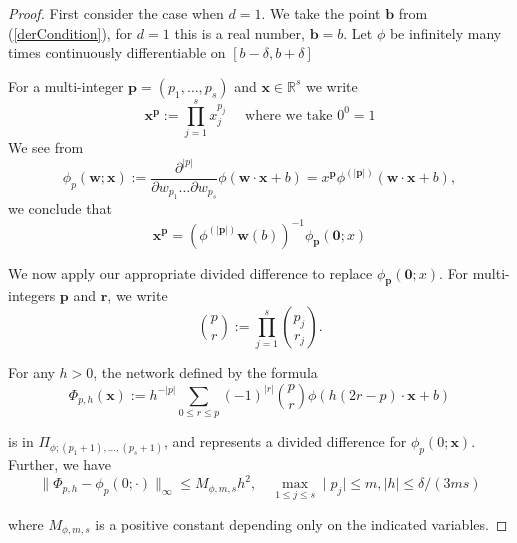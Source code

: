 \documentclass[11pt,a4paper]{article}
\theoremstyle{plain}
\theoremstyle{definition}
\theoremstyle{remark}
\numberwithin{equation}{section}
\begin{document}
\begin{proof}
    
First consider the case when \(d = 1\). We take the point \(\mathbf{b} \) from (\ref{derCondition}), for \(d = 1\) this is a real number, \(\mathbf{b} = b \).
Let \(\phi \) be infinitely many times continuously differentiable on \([b-\delta ,b+\delta ]\)

For a multi-integer \(\mathbf{p} = (p_1, \ldots , p_{s} )\) and \(\mathbf{x} \in \mathbb{R}^s\) we write 
\begin{equation}
    \mathbf{x}^{\mathbf{p} } := \prod_{j=1}^{s} x_{j}^{p_{j}} \quad \text{ where we take } 0^0 = 1
\end{equation}
We see from
\begin{equation}
    \phi_{p}(\mathbf{w}; \mathbf{x}) := \frac{\partial^{|p|}}{\partial w_{p_1} \dots \partial w_{p_s}} \phi(\mathbf{w} \cdot \mathbf{x} + b) = x^{\mathbf{p} } \phi^{(|\mathbf{p}|)}(\mathbf{w} \cdot \mathbf{x} + b),
\end{equation}
we conclude that
\begin{equation}
    \mathbf{x}^{\mathbf{p} } = \left(
        \phi^{(|\mathbf{p}|)}\mathbf{w} (b)
        \right)^{-1} \phi_{\mathbf{p} }(\textbf{0} ; x)
\end{equation}

We now apply our appropriate divided difference to replace \(\phi_{\mathbf{p} }(\textbf{0} ; x)\).
For multi-integers \(\mathbf{p}\) and \(\mathbf{r} \), we write
\begin{equation}
    \binom{p}{r} := \prod_{j=1}^{s} \binom{p_j}{r_j}.
\end{equation}

For any \( h > 0 \), the network defined by the formula
\begin{equation}
    \Phi_{p,h}(\mathbf{x}) := h^{-|p|} \sum_{0 \leq r \leq p} (-1)^{|r|} \binom{p}{r} \phi(h(2r - p) \cdot \mathbf{x} + b)
\end{equation}    

is in \( \Pi_{\phi;(p_1+1), \ldots, (p_s+1)} \), and represents a divided difference for \( \phi_{p}(0; \mathbf{x}) \). Further, we have
\begin{equation}
    \| \Phi_{p,h} - \phi_{p}(0; \cdot) \|_{\infty} \leq M_{\phi,m,s}h^2, \quad \mathop{\max}_{1 \leq j \leq s} \mid p_{j} \mid \leq m, \mid h \mid \leq \delta / (3ms)
\end{equation}

where \( M_{\phi,m,s} \) is a positive constant depending only on the indicated variables.


\end{proof}
\end{document}

